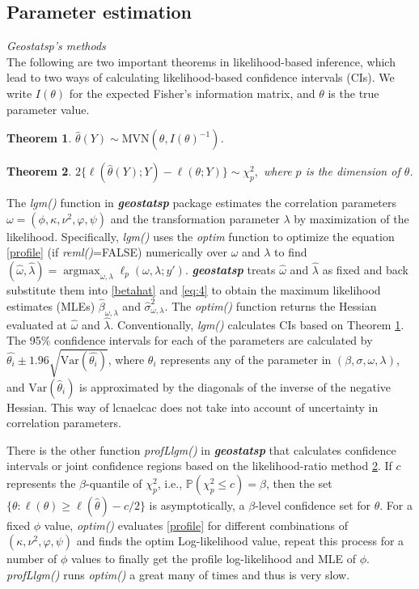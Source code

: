 \documentclass{article}\usepackage[]{graphicx}\usepackage[]{color}
\DeclareMathOperator*{\argmax}{argmax}
\newcommand{\pkg}[1]{\textbf{\emph{#1}}}
\newcommand{\fct}[1]{\textit{#1()}}
\def\MVN{{\mathrm{MVN}}}
\def\var{{\mathrm{Var}}}
\def\Pr{{\mathbb{P}}}
\newtheorem{theorem}{Theorem}[section]
\begin{document}
\subsection{Parameter estimation}
\textit{Geostatsp's methods}\vspace{0.5cm}\\
The following are two important theorems in likelihood-based inference, which lead to two ways of calculating likelihood-based confidence intervals (CIs). %
We write $I(\theta)$ for the expected Fisher's information matrix, and $\theta$ is the true parameter value. 
\begin{theorem}
\label{R1}
$\hat{\theta}(Y) \sim \MVN(\theta, I(\theta)^{-1})$.
\end{theorem}
%
\begin{theorem}
\label{R2}
$2\{\ell(\hat\theta(Y); Y)-\ell(\theta;Y) \} \sim \chi^2_p ,$ where $p$ is the dimension of $\theta$.
\end{theorem}
The \fct{lgm} function in \pkg{geostatsp} package estimates the correlation parameters $\omega=(\phi,\kappa,\nu^2, \varphi, \psi)$ and the transformation parameter $\lambda$ by maximization of the likelihood. Specifically, \fct{lgm} uses the \textit{optim} function to optimize the equation \eqref{profile} (if \fct{reml}=FALSE)  numerically over $\omega$ and $\lambda$ to find $(\hat{\omega},\hat{\lambda}) = \argmax_{\omega,\lambda} \ell_p(\omega, \lambda; y')$.  \pkg{geostatsp} treats $\hat{\omega}$ and $\hat{\lambda}$ as fixed and back substitute them into \eqref{betahat} and \eqref{eq:4} to obtain the maximum likelihood estimates (MLEs) $\hat{\beta}_{\omega,\lambda}$ and $\hat{{\sigma}}^2_{\omega,\lambda}$. The \fct{optim} function returns the Hessian evaluated at $\hat{\omega}$ and $\hat{\lambda}$.  Conventionally, \fct{lgm} calculates CIs based on Theorem \ref{R1}. The 95\% confidence intervals for each of the parameters are calculated by $\hat{\theta_i} \pm 1.96 \sqrt{\var(\hat{\theta_i})}$, where $\theta_i$ represents any of the parameter in $(\beta,\sigma, \omega,\lambda)$, and  $\var(\hat{\theta}_i)$ is approximated by the diagonals of the inverse of the negative Hessian. This way of lcnaelcac does not take into account of uncertainty in correlation parameters.


There is the other function \fct{profLlgm} in \pkg{geostatsp} that calculates confidence intervals or joint confidence regions based on the likelihood-ratio method \ref{R2}. If $c$ represents the $\beta$-quantile of $\chi^2_p$, i.e., $\Pr(\chi^2_p \leq c)=\beta$, then the set $\{\theta: \ell(\theta) \geq \ell(\hat{\theta}) - c/2 \}$ is asymptotically, a $\beta$-level confidence set for $\theta$. For a fixed $\phi$ value, \fct{optim} evaluates \eqref{profile} for different combinations of $(\kappa,\nu^2, \varphi, \psi)$ and finds the optim Log-likelihood value, repeat this process for a number of $\phi$ values to finally get the profile log-likelihood and MLE of $\phi$.  \fct{profLlgm} runs \fct{optim} a great many of times and thus is very slow.
\end{document}
